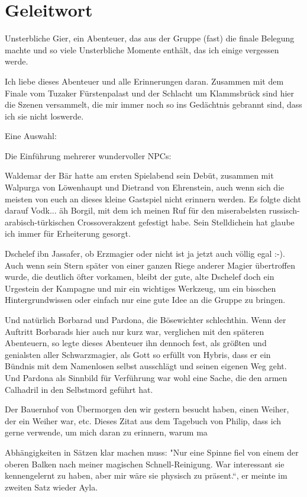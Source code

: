 \documentclass[11pt]{scrreprt}
\begin{document}
\section{Geleitwort}
Unsterbliche Gier, ein Abenteuer, das aus der Gruppe (fast) die finale  Belegung machte und so viele Unsterbliche Momente enthält, das ich einige vergessen werde.\par
Ich liebe dieses Abenteuer und alle Erinnerungen daran. Zusammen mit dem Finale vom Tuzaker Fürstenpalast und der Schlacht um Klammsbrück sind hier die Szenen versammelt, die mir immer noch so ins Gedächtnis gebrannt sind, dass ich sie nicht loswerde.\par
Eine Auswahl:\par
Die Einführung mehrerer wundervoller NPCs:\par
Waldemar der Bär hatte am ersten Spielabend sein Debüt, zusammen mit Walpurga von Löwenhaupt und Dietrand von Ehrenstein, auch wenn sich die meisten von euch an dieses kleine Gastspiel nicht erinnern werden. Es folgte dicht darauf Vodk... äh Borgil, mit dem ich meinen Ruf für den miserabelsten russisch-arabisch-türkischen Crossoverakzent gefestigt habe. Sein Stelldichein hat glaube ich immer für Erheiterung gesorgt.\par
Dschelef ibn Jassafer, ob Erzmagier oder nicht ist ja jetzt auch völlig egal :-). Auch wenn sein Stern später von einer ganzen Riege anderer Magier übertroffen wurde, die deutlich öfter vorkamen, bleibt der gute, alte Dschelef doch ein Urgestein der Kampagne und mir ein wichtiges Werkzeug, um ein bisschen Hintergrundwissen oder einfach nur eine gute Idee an die Gruppe zu bringen.\par
Und natürlich Borbarad und Pardona, die Bösewichter schlechthin. Wenn der Auftritt Borbarads hier auch nur kurz war, verglichen mit den späteren Abenteuern, so legte dieses Abenteuer ihn dennoch fest, als größten und genialsten aller Schwarzmagier, als Gott so erfüllt von Hybris, dass er ein Bündnis mit dem Namenlosen selbst ausschlägt und seinen eigenen Weg geht. Und Pardona als Sinnbild für Verführung war wohl eine Sache, die den armen Calhadril in den Selbstmord geführt hat.\par
Der Bauernhof von Übermorgen den wir gestern besucht haben, einen Weiher, der ein Weiher war, etc.
Dieses Zitat aus dem Tagebuch von Philip, dass ich gerne verwende, um mich daran zu erinnern, warum ma\par Abhängigkeiten in Sätzen klar machen muss: "Nur eine Spinne fiel von einem der oberen Balken nach meiner magischen Schnell-Reinigung. War interessant sie kennengelernt zu haben, aber mir wäre sie physisch zu präsent.“, er meinte im zweiten Satz wieder Ayla.\par
\end{document}
